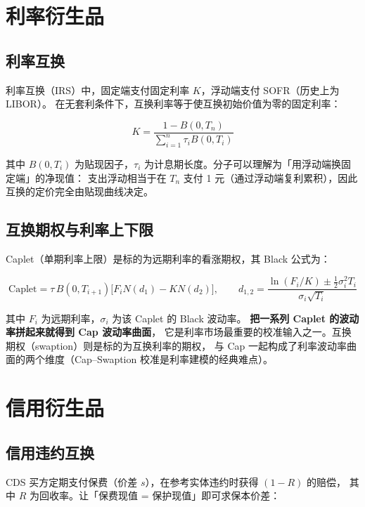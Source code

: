 \section{利率衍生品}

\subsection{利率互换}

利率互换（IRS）中，固定端支付固定利率 $K$，浮动端支付 SOFR（历史上为 LIBOR）。
在无套利条件下，互换利率等于使互换初始价值为零的固定利率：

\begin{equation}
  K = \frac{1 - B(0,T_n)}{\sum_{i=1}^{n}\tau_i B(0,T_i)}
  \label{eq:04-irs}
\end{equation}

其中 $B(0,T_i)$ 为贴现因子，$\tau_i$ 为计息期长度。分子可以理解为「用浮动端换固定端」的净现值：
支出浮动相当于在 $T_n$ 支付 1 元（通过浮动端复利累积），因此互换的定价完全由贴现曲线决定。

\subsection{互换期权与利率上下限}

Caplet（单期利率上限）是标的为远期利率的看涨期权，其 Black 公式为：

\begin{equation}
  \text{Caplet} = \tau\,B(0,T_{i+1})\Big[F_i N(d_1) - K N(d_2)\Big],
  \qquad d_{1,2} = \frac{\ln(F_i/K)\pm\tfrac12\sigma_i^2T_i}{\sigma_i\sqrt{T_i}}
  \label{eq:04-caplet}
\end{equation}

其中 $F_i$ 为远期利率，$\sigma_i$ 为该 Caplet 的 Black 波动率。
\textbf{把一系列 Caplet 的波动率拼起来就得到 Cap 波动率曲面}，
它是利率市场最重要的校准输入之一。互换期权（swaption）则是标的为互换利率的期权，
与 Cap 一起构成了利率波动率曲面的两个维度（Cap--Swaption 校准是利率建模的经典难点）。

\section{信用衍生品}

\subsection{信用违约互换}

CDS 买方定期支付保费（价差 $s$），在参考实体违约时获得 $(1-R)$ 的赔偿，
其中 $R$ 为回收率。让「保费现值 = 保护现值」即可求保本价差：

